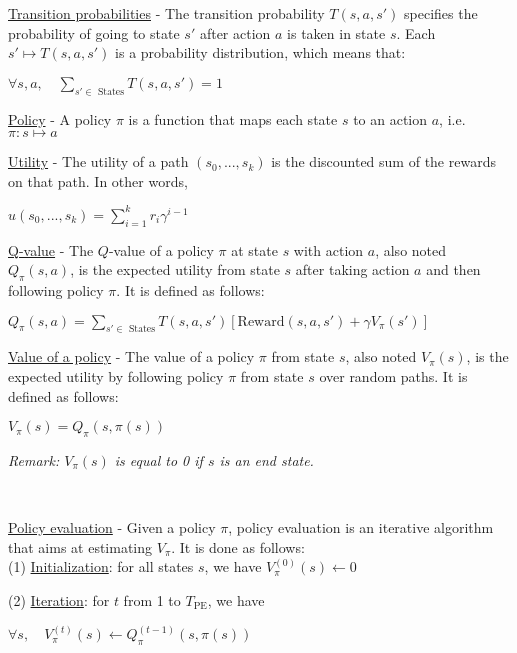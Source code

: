 \documentclass[4pt,landscape]{article}
\begin{document}
\begin{multicols*}{4}
{\underline{Transition probabilities} - The transition probability $T(s,a,s')$ specifies the probability of going to state $s'$ after action $a$ is taken in state $s$. Each $s' \mapsto T(s,a,s')$ is a probability distribution, which means that:}\par

$\forall s,a,\quad{\sum_{s'\in\textrm{ States}}T(s,a,s')=1}$


{\underline{Policy} - A policy $\pi$ is a function that maps each state $s$ to an action $a$, i.e.${\pi : s \mapsto a}$}\par


{\underline{Utility} - The utility of a path $(s_0, ..., s_k)$ is the discounted sum of the rewards on that path. In other words,}\par

${u(s_0,...,s_k)=\sum_{i=1}^{k}r_i\gamma^{i-1}}$

{\underline{Q-value} - The $Q$-value of a policy $\pi$ at state $s$ with action $a$, also noted $Q_{\pi}(s,a)$, is the expected utility from state $s$ after taking action $a$ and then following policy $\pi$. It is defined as follows:}\par

${Q_{\pi}(s,a)=\sum_{s'\in\textrm{ States}}T(s,a,s')\left[\textrm{Reward}(s,a,s')+\gamma V_\pi(s')\right]}$


{\underline{Value of a policy} - The value of a policy $\pi$ from state $s$, also noted $V_{\pi}(s)$, is the expected utility by following policy $\pi$ from state $s$ over random paths. It is defined as follows:}\par

${V_\pi(s)=Q_\pi(s,\pi(s))}$

{\textit{Remark: $V_\pi(s)$ is equal to 0 if $s$ is an end state.}}\par
{\color{cyan} \hrulefill}\\
\columnbreak

\underline{Policy evaluation} - Given a policy $\pi$, policy evaluation is an iterative algorithm that aims at estimating $V_\pi$. It is done as follows:\\

(1) \underline{Initialization}: for all states $s$, we have ${V_\pi^{(0)}(s)\longleftarrow0}$

(2) \underline{Iteration}: for $t$ from 1 to $T_{\textrm{PE}}$, we have

$\forall s,\quad{V_\pi^{(t)}(s)\longleftarrow Q_\pi^{(t-1)}(s,\pi(s))}$


\end{multicols*}
\end{document}
